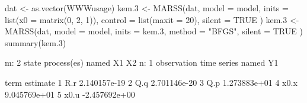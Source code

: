 \begin{Schunk}
\begin{Sinput}
 dat <- as.vector(WWWusage)
 kem.3 <- MARSS(dat,
   model = model, inits = list(x0 = matrix(0, 2, 1)),
   control = list(maxit = 20), silent = TRUE
 )
 kem.3 <- MARSS(dat,
   model = model, inits = kem.3,
   method = "BFGS", silent = TRUE
 )
 summary(kem.3)
\end{Sinput}
\begin{Soutput}
m: 2 state process(es) named X1 X2
n: 1 observation time series named Y1

  term      estimate
1  R.r  2.140157e-19
2  Q.q  2.701146e-20
3  Q.p  1.273883e+01
4 x0.x  9.045769e+01
5 x0.u -2.457692e+00
\end{Soutput}
\end{Schunk}

